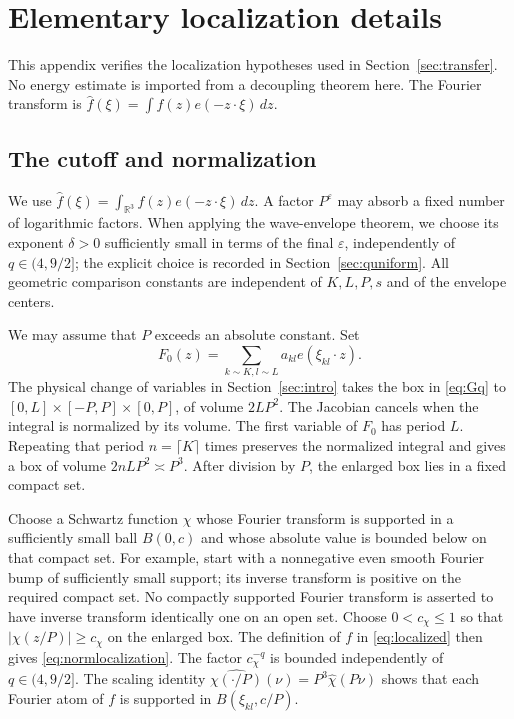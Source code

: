 \documentclass[11pt,reqno]{amsart}
\numberwithin{equation}{section}
\theoremstyle{definition}
\theoremstyle{remark}
\newcommand{\R}{\mathbb R}
\newcommand{\eps}{\varepsilon}
\begin{document}
\appendix
\section{Elementary localization details}\label{app:localization}
This appendix verifies the localization hypotheses used in Section~\ref{sec:transfer}.
No energy estimate is imported from a decoupling theorem here.
The Fourier transform is $\widehat f(\xi)=\int f(z)e(-z\cdot\xi)\,dz$.

\subsection{The cutoff and normalization}
We use $\widehat f(\xi)=\int_{\R^3}f(z)e(-z\cdot\xi)\,dz$.
A factor $P^\eps$ may absorb a fixed number of logarithmic factors.
When applying the wave-envelope theorem, we choose its exponent $\delta>0$ sufficiently small in terms of the final $\eps$, independently of $q\in(4,9/2]$; the explicit choice is recorded in Section~\ref{sec:quniform}.
All geometric comparison constants are independent of $K,L,P,s$ and of the envelope centers.

We may assume that $P$ exceeds an absolute constant. Set
\[
 F_0(z)=\sum_{k\sim K,l\sim L}a_{kl}e(\xi_{kl}\cdot z).
\]
The physical change of variables in Section~\ref{sec:intro} takes the box in \eqref{eq:Gq} to $[0,L]\times[-P,P]\times[0,P]$, of volume $2LP^2$.
The Jacobian cancels when the integral is normalized by its volume.
The first variable of $F_0$ has period $L$. Repeating that period $n=\lceil K\rceil$ times preserves the normalized integral and gives a box of volume $2nLP^2\asymp P^3$.
After division by $P$, the enlarged box lies in a fixed compact set.

Choose a Schwartz function $\chi$ whose Fourier transform is supported in a sufficiently small ball $B(0,c)$ and whose absolute value is bounded below on that compact set.
For example, start with a nonnegative even smooth Fourier bump of sufficiently small support; its inverse transform is positive on the required compact set.
No compactly supported Fourier transform is asserted to have inverse transform identically one on an open set.
Choose $0<c_\chi\le1$ so that $|\chi(z/P)|\ge c_\chi$ on the enlarged box.
The definition of $f$ in \eqref{eq:localized} then gives \eqref{eq:normlocalization}.
The factor $c_\chi^{-q}$ is bounded independently of $q\in(4,9/2]$.
The scaling identity
$\widehat{\chi(\cdot/P)}(\nu)=P^3\widehat\chi(P\nu)$
shows that each Fourier atom of $f$ is supported in $B(\xi_{kl},c/P)$.
\end{document}
